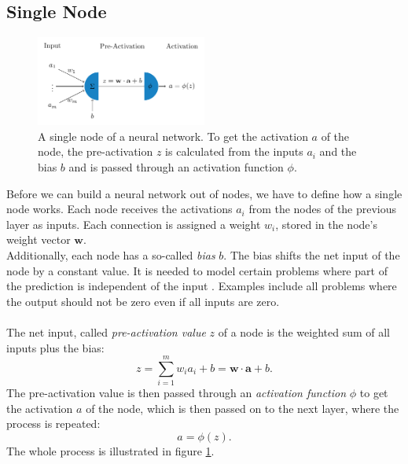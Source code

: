 \subsection{Single Node}
\label{subsec:single-neuron}
\begin{figure}
    \centering
    \includegraphics[width=0.5\textwidth]{single_neuron}
    \caption{A single node of a neural network. To get the activation $a$ of the node, the pre-activation $z$ is calculated from the inputs $a_i$ and the bias $b$ and is passed through an activation function $\phi$.}
    \label{fig:single-neuron}
\end{figure}
Before we can build a neural network out of nodes, we have to define how a single node works.
Each node receives the activations $a_i$ from the nodes of the previous layer as inputs.
Each connection is assigned a weight $w_i$, stored in the node's weight vector $\bm{w}$.
\\
Additionally, each node has a so-called \textit{bias} $b$.
The bias shifts the net input of the node by a constant value.
It is needed to model certain problems where part of the prediction is independent of the input \cite[6]{aggarwal_neural_2018}.
Examples include all problems where the output should not be zero even if all inputs are zero.
\\
\\
The net input, called \textit{pre-activation value} $z$ of a node is the weighted sum of all inputs plus the bias:
\begin{equation}
    z = \sum_{i=1}^{m} w_i a_i + b = \bm{w} \cdot \bm{a} + b \text{.}
    \label{eq:pre-activation}
\end{equation}
The pre-activation value is then passed through an \textit{activation function} $\phi$ to get the activation $a$ of the node, which is then passed on to the next layer, where the process is repeated:
\begin{equation}
    a = \phi(z) \text{.}
    \label{eq:activation}
\end{equation}
The whole process is illustrated in figure \ref{fig:single-neuron}.

